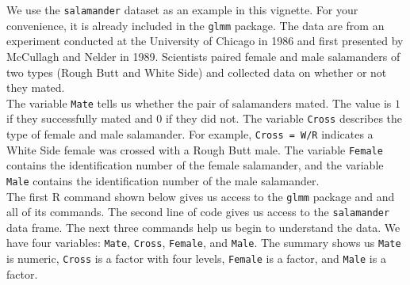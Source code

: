 \documentclass[11pt]{article}\usepackage[]{graphicx}\usepackage[]{color}
\begin{document}
We use the \texttt{salamander} dataset as an example in this vignette. For your convenience, it is already included in the \texttt{glmm} package. The data are from an experiment conducted at the University of Chicago in 1986 and first presented by McCullagh and Nelder in 1989. Scientists paired female and male salamanders of two types (Rough Butt and White Side) and collected data on whether or not they mated. \\

The variable \texttt{Mate} tells us whether the pair of salamanders mated. The value is $1$ if they successfully mated and $0$ if they did not. The variable \texttt{Cross} describes the type of female and male salamander. For example, \texttt{Cross = W/R} indicates a White Side female was crossed with a Rough Butt male. The variable \texttt{Female} contains the identification number of the female salamander, and the variable \texttt{Male} contains the identification number of the male salamander.\\ 

The first R  command shown below gives us access to the \texttt{glmm} package and and all of its commands. The second line of code gives us access to the \texttt{salamander} data frame.  The next three commands help us begin to understand the data. We have four variables: \texttt{Mate}, \texttt{Cross}, \texttt{Female}, and \texttt{Male}. The summary shows us \texttt{Mate} is numeric, \texttt{Cross} is a factor with four levels, \texttt{Female} is a factor, and \texttt{Male} is a factor. \\
\end{document}
